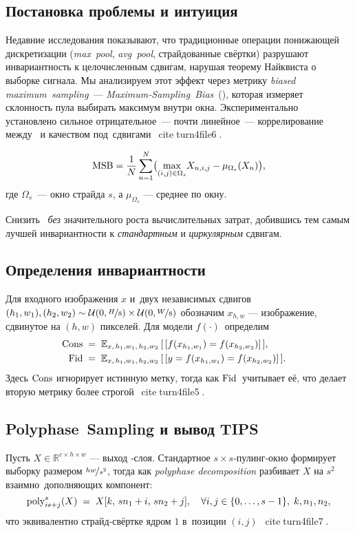 \subsection{Постановка проблемы и интуиция}
Недавние исследования показывают, что традиционные операции понижающей
дискретизации (\emph{max pool}, \emph{avg pool}, страйдованные свёртки)
разрушают инвариантность к целочисленным сдвигам, нарушая теорему Найквиста
о выборке сигнала.  Мы анализируем этот эффект через метрику
\emph{biased maximum sampling} — \emph{Maximum‑Sampling Bias}~(\msb),
которая измеряет склонность пула выбирать максимум внутри окна.
Экспериментально установлено сильное отрицательное — почти линейное —
коррелирование между \msb{} и качеством под сдвигами citeturn4file6.

\begin{equation}
  \mathrm{MSB} = \frac{1}{N}\sum_{n=1}^{N}\bigl(\max_{(i,j)\in\Omega_s}\!X_{n,i,j} - \mu_{\Omega_s}(X_n)\bigr),
  \label{eq:msb}
\end{equation}
где $\Omega_s$ — окно страйда $s$, а $\mu_{\Omega_s}$ — среднее по окну.

 Снизить \msb{} \emph{без} значительного роста
вычислительных затрат, добившись тем самым лучшей инвариантности к
\emph{стандартным} и \emph{циркулярным} сдвигам.

\subsection{Определения инвариантности}
\label{sec:tips:definitions}
Для входного изображения $x$ и двух независимых сдвигов
$(h_1,w_1),(h_2,w_2)\sim\mathcal U(0,\nicefrac{H}{8})\times\mathcal U(0,\nicefrac{W}{8})$
обозначим $x_{h,w}$ — изображение, сдвинутое на $(h,w)$ пикселей.
Для модели $f(\cdot)$ определим
\begin{align}
  \mathrm{Cons} &\;=\; \mathbb{E}_{x,\,h_1,w_1,\,h_2,w_2}\,[\,[f(x_{h_1,w_1})=f(x_{h_2,w_2})]\,],\label{eq:cons}\cr
  \mathrm{Fid}    &\;=\; \mathbb{E}_{x,\,h_1,w_1,\,h_2,w_2}\,[\,[y=f(x_{h_1,w_1})=f(x_{h_2,w_2})]\,].\label{eq:fid}
\end{align}
Здесь $\mathrm{Cons}$ игнорирует истинную метку, тогда как
$\mathrm{Fid}$~учитывает её, что делает вторую метрику более строгой citeturn4file5.

\subsection{Polyphase Sampling и вывод TIPS}
\label{sec:tips:method}
Пусть $X\in\mathbb R^{c\times h\times w}$ — выход \relu{}‑слоя.
Стандартное $s\times s$‑пулинг‑окно формирует выборку размером
$\nicefrac{hw}{s^2}$, тогда как \emph{polyphase decomposition} разбивает
$X$ на $s^2$ взаимно дополняющих компонент:
\begin{equation}
  \operatorname{poly}_{i s + j}^{s}(X) \;=\;
  X[k,\,sn_1+i,\,sn_2+j],
  \quad \forall i,j\in\{0,\dots,s-1\},\;k,n_1,n_2,\label{eq:polyphase}
\end{equation}
что эквивалентно страйд‑свёртке ядром $1$ в позиции $(i,j)$ citeturn4file7.

